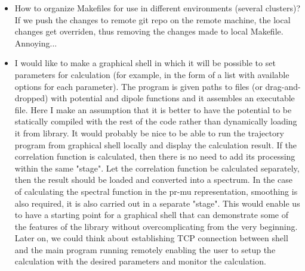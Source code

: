 \documentclass{article}
\begin{document}
\begin{itemize}
    \item How to organize Makefiles for use in different environments (several clusters)? If we push the changes to remote git repo on the remote machine, the local changes get overriden, thus removing the changes made to local Makefile. Annoying... 
    \item I would like to make a graphical shell in which it will be possible to set parameters for calculation (for example, in the form of a list with available options for each parameter). The program is given paths to files (or drag-and-dropped) with potential and dipole functions and it assembles an executable file. Here I make an assumption that it is better to have the potential to be statically compiled with the rest of the code rather than dynamically loading it from library. It would probably be nice to be able to run the trajectory program from graphical shell locally and display the calculation result. If the correlation function is calculated, then there is no need to add its processing within the same "stage". Let the correlation function be calculated separately, then the result should be loaded and converted into a spectrum. In the case of calculating the spectral function in the pr-mu representation, smoothing is also required, it is also carried out in a separate "stage". This would enable us to have a starting point for a graphical shell that can demonstrate some of the features of the library without overcomplicating from the very beginning. Later on, we could think about establishing TCP connection between shell and the main program running remotely enabling the user to setup the calculation with the desired parameters and monitor the calculation. 
\end{itemize}
\end{document}
